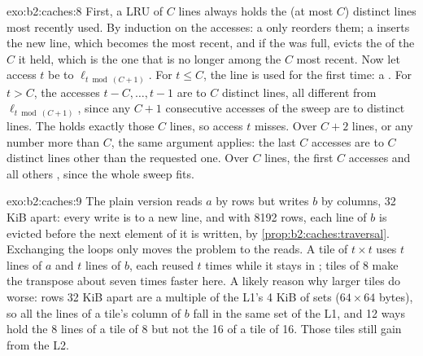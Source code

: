 \begin{solution}{exo:b2:caches:8}
First, a  LRU  of $C$ lines always holds the (at most $C$) distinct lines most recently used.
By induction on the accesses: a  only reorders them; a  inserts the new line, which becomes the most recent,
and if the  was full, evicts the  of the $C$ it held, which is the one that is no longer
among the $C$ most recent.
Now let access $t$ be to $\ell_{t \bmod (C+1)}$. For $t \le C$, the line is used for the first time: a . For
$t > C$, the accesses $t - C, \dots, t - 1$ are to $C$ distinct lines, all different from $\ell_{t \bmod (C+1)}$,
since any $C + 1$ consecutive accesses of the sweep are to distinct lines. The  holds exactly those $C$ lines,
so access $t$ misses.
Over $C + 2$ lines, or any number more than $C$, the same argument applies: the last $C$ accesses are to $C$ distinct
lines other than the requested one. Over $C$ lines, the first $C$ accesses  and all others , since the whole
sweep fits.
\end{solution}

\begin{solution}{exo:b2:caches:9}
The plain version reads $a$ by rows but writes $b$ by columns, 32 KiB apart: every write is to a new line, and with
8192 rows, each line of $b$ is evicted before the next element of it is written, by
\cref{prop:b2:caches:traversal}. Exchanging the loops only moves the problem to the reads. A tile of $t \times t$ uses
$t$ lines of $a$ and $t$ lines of $b$, each reused $t$ times while it stays in ; tiles of 8 make the transpose
about seven times faster here. A likely reason why larger tiles do worse: rows 32 KiB apart are a multiple of the L1's 4 KiB of sets
($64 \times 64$ bytes), so all the lines of a tile's column of $b$ fall in the same set of the L1, and 12 ways hold
the 8 lines of a tile of 8 but not the 16 of a tile of 16. Those tiles still gain from the L2.
\end{solution}

